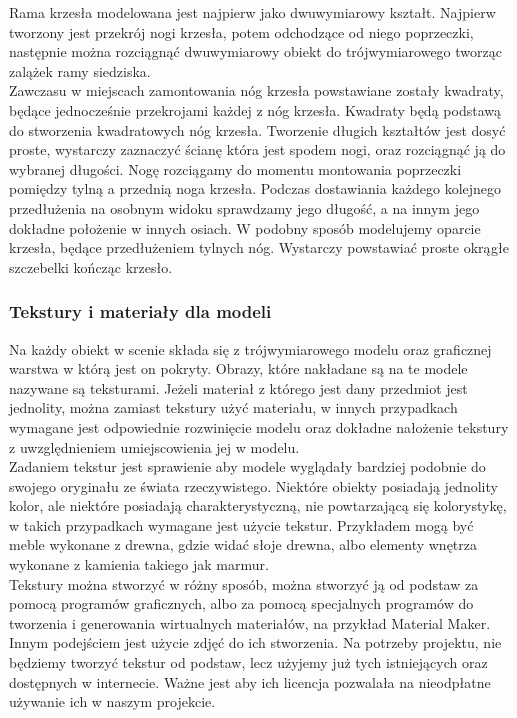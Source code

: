 \documentclass{article} %
\begin{document}
            
            Rama krzesła modelowana jest najpierw jako dwuwymiarowy kształt. Najpierw tworzony jest przekrój nogi krzesła, potem odchodzące od niego poprzeczki, następnie można rozciągnąć dwuwymiarowy obiekt do trójwymiarowego tworząc zalążek ramy siedziska.
            \\
            
            Zawczasu w miejscach zamontowania nóg krzesła powstawiane zostały kwadraty, będące jednocześnie przekrojami każdej z nóg krzesła. Kwadraty będą podstawą do stworzenia kwadratowych nóg krzesła. Tworzenie długich kształtów jest dosyć proste, wystarczy zaznaczyć ścianę która jest spodem nogi, oraz rozciągnąć ją do wybranej długości. Nogę rozciągamy do momentu montowania poprzeczki pomiędzy tylną a przednią noga krzesła. Podczas dostawiania każdego kolejnego przedłużenia na osobnym widoku sprawdzamy jego długość, a na innym jego dokładne położenie w innych osiach. W podobny sposób modelujemy oparcie krzesła, będące przedłużeniem tylnych nóg. Wystarczy powstawiać proste okrągłe szczebelki kończąc krzesło.
            \\
            
        \subsubsection{Tekstury i materiały dla modeli}
            Na każdy obiekt w scenie składa się z trójwymiarowego modelu oraz graficznej warstwa w którą jest on pokryty. Obrazy, które nakładane są na te modele nazywane są teksturami. Jeżeli materiał z którego jest dany przedmiot jest jednolity, można zamiast tekstury użyć materiału, w innych przypadkach wymagane jest odpowiednie rozwinięcie modelu oraz dokładne nałożenie tekstury z uwzględnieniem umiejscowienia jej w modelu.
            \\
        
            Zadaniem tekstur jest sprawienie aby modele wyglądały bardziej podobnie do swojego oryginału ze świata rzeczywistego. Niektóre obiekty posiadają jednolity kolor, ale niektóre posiadają charakterystyczną, nie powtarzającą się kolorystykę, w takich przypadkach wymagane jest użycie tekstur. Przykładem mogą być meble wykonane z drewna, gdzie widać słoje drewna, albo elementy wnętrza wykonane z kamienia takiego jak marmur.
            \\
            
            Tekstury można stworzyć w różny sposób, można stworzyć ją od podstaw za pomocą programów graficznych, albo za pomocą specjalnych programów do tworzenia i generowania wirtualnych materiałów, na przykład Material Maker. Innym podejściem jest użycie zdjęć do ich stworzenia. Na potrzeby projektu, nie będziemy tworzyć tekstur od podstaw, lecz użyjemy już tych istniejących oraz dostępnych w internecie. Ważne jest aby ich licencja pozwalała na nieodpłatne używanie ich w naszym projekcie.
            \\
            
\end{document}
